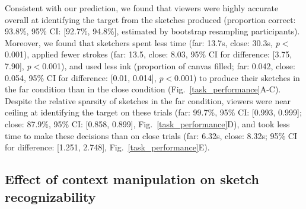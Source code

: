 \documentclass{svjour3}
\begin{document}

Consistent with our prediction, we found that viewers were highly accurate overall at identifying the target from the sketches produced (proportion correct: 93.8\%, 95\% CI: [92.7\%, 94.8\%], estimated by bootstrap resampling participants). 
Moreover, we found that sketchers spent less time (far: 13.7s, close: 30.3s, \textit{p}$<$0.001), applied fewer strokes (far: 13.5, close: 8.03, 95\% CI for difference: [3.75, 7.90], \textit{p}$<$0.001), and used less ink (proportion of canvas filled; far: 0.042, close: 0.054, 95\% CI for difference: [0.01, 0.014], \textit{p}$<$0.001) to produce their sketches in the far condition than in the close condition (Fig.~\ref{task_performance}A-C). 
Despite the relative sparsity of sketches in the far condition, viewers were near ceiling at identifying the target on these trials (far: 99.7\%, 95\% CI: [0.993, 0.999]; close: 87.9\%, 95\% CI: [0.858, 0.899], Fig.~\ref{task_performance}D), and took less time to make these decisions than on close trials (far: 6.32s, close: 8.32s; 95\% CI for difference: [1.251, 2.748], Fig.~\ref{task_performance}E).

\subsection*{Effect of context manipulation on sketch recognizability}
\end{document}
